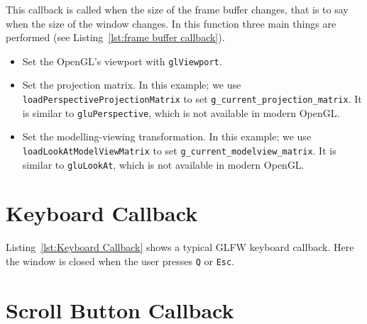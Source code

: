 \documentclass[11pt,oneside,a4paper,final]{article}
\begin{document}
This callback is called when the size of the frame buffer changes, that is to 
say when the size of the window changes. In this function three main things are 
performed (see Listing~\ref{lst:frame buffer callback}).
\begin{itemize}
 \item Set the OpenGL's viewport with \verb+glViewport+.
 
 \item Set the projection matrix. In this example; we use 
    \verb+loadPerspectiveProjectionMatrix+ to set 
    \verb+g_current_projection_matrix+. It is similar to \verb+gluPerspective+, 
    which is not available in modern OpenGL.
 
 \item Set the modelling-viewing transformation. In this example; we use 
    \verb+loadLookAtModelViewMatrix+ to set 
    \verb+g_current_modelview_matrix+. It is similar to \verb+gluLookAt+, 
    which is not available in modern OpenGL.
 
\end{itemize}

\begin{center}

\end{center}


\section{Keyboard Callback}
\label{sec:Keyboard Callback}

Listing~\ref{lst:Keyboard Callback} shows a typical GLFW keyboard callback. 
Here the window is closed when the user presses \verb+Q+ or \verb+Esc+.

\begin{center}

\end{center}


\section{Scroll Button Callback}
\label{sec:Scroll button callback}
\end{document}
